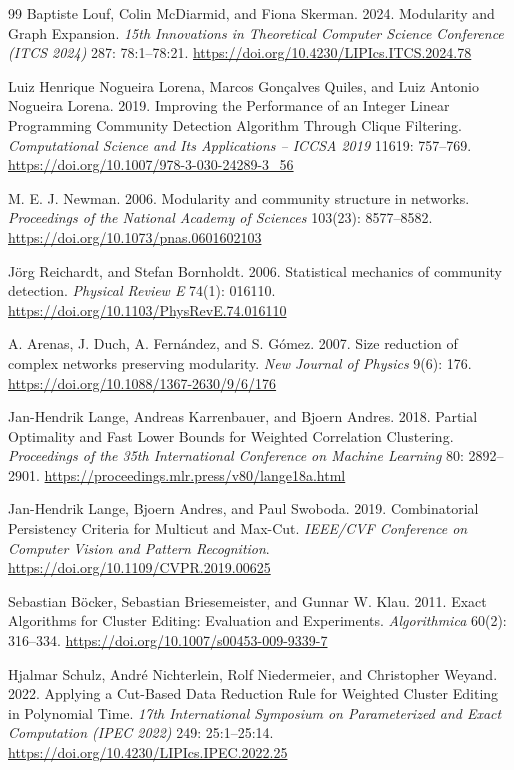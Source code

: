 \documentclass[sigconf,anonymous,review]{acmart}
\newcommand{\1}{\mathbf{1}}
\begin{document}
\begin{thebibliography}{99}
Baptiste Louf, Colin McDiarmid, and Fiona Skerman. 2024. Modularity and Graph Expansion. \emph{15th Innovations in Theoretical Computer Science Conference (ITCS 2024)} 287: 78:1--78:21. \url{https://doi.org/10.4230/LIPIcs.ITCS.2024.78}

Luiz Henrique Nogueira Lorena, Marcos Gon{\c c}alves Quiles, and Luiz Antonio Nogueira Lorena. 2019. Improving the Performance of an Integer Linear Programming Community Detection Algorithm Through Clique Filtering. \emph{Computational Science and Its Applications -- ICCSA 2019} 11619: 757--769. \url{https://doi.org/10.1007/978-3-030-24289-3_56}

M. E. J. Newman. 2006. Modularity and community structure in networks. \emph{Proceedings of the National Academy of Sciences} 103(23): 8577--8582. \url{https://doi.org/10.1073/pnas.0601602103}

J{\"o}rg Reichardt, and Stefan Bornholdt. 2006. Statistical mechanics of community detection. \emph{Physical Review E} 74(1): 016110. \url{https://doi.org/10.1103/PhysRevE.74.016110}

A. Arenas, J. Duch, A. Fern{\'a}ndez, and S. G{\'o}mez. 2007. Size reduction of complex networks preserving modularity. \emph{New Journal of Physics} 9(6): 176. \url{https://doi.org/10.1088/1367-2630/9/6/176}

Jan-Hendrik Lange, Andreas Karrenbauer, and Bjoern Andres. 2018. Partial Optimality and Fast Lower Bounds for Weighted Correlation Clustering. \emph{Proceedings of the 35th International Conference on Machine Learning} 80: 2892--2901. \url{https://proceedings.mlr.press/v80/lange18a.html}

Jan-Hendrik Lange, Bjoern Andres, and Paul Swoboda. 2019. Combinatorial Persistency Criteria for Multicut and Max-Cut. \emph{IEEE/CVF Conference on Computer Vision and Pattern Recognition}. \url{https://doi.org/10.1109/CVPR.2019.00625}

Sebastian B{\"o}cker, Sebastian Briesemeister, and Gunnar W. Klau. 2011. Exact Algorithms for Cluster Editing: Evaluation and Experiments. \emph{Algorithmica} 60(2): 316--334. \url{https://doi.org/10.1007/s00453-009-9339-7}

Hjalmar Schulz, Andr{\'e} Nichterlein, Rolf Niedermeier, and Christopher Weyand. 2022. Applying a Cut-Based Data Reduction Rule for Weighted Cluster Editing in Polynomial Time. \emph{17th International Symposium on Parameterized and Exact Computation (IPEC 2022)} 249: 25:1--25:14. \url{https://doi.org/10.4230/LIPIcs.IPEC.2022.25}


\end{thebibliography}
\end{document}
